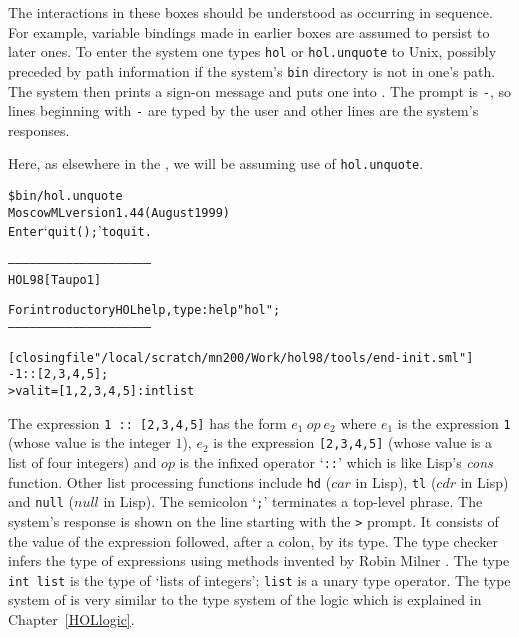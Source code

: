 The interactions in these boxes should be understood as occurring in
sequence.  For example, variable bindings made in earlier boxes are
assumed to persist to later ones.  To enter the \HOL{} system one types
{\small\verb|hol|} or {\small\verb|hol.unquote|} to Unix, possibly
  preceded by path information if the \HOL{} system's \texttt{bin}
  directory is not in one's path.  The \HOL{} system then prints a
  sign-on message and puts one into \ML.  The \ML{} prompt is
  {\small\verb|-|}, so lines beginning with {\small\verb|-|} are typed
  by the user and other lines are the system's responses.

  Here, as elsewhere in the \TUTORIAL{}, we will be assuming use of
  {\small\verb|hol.unquote|}.

\setcounter{sessioncount}{1}
\begin{session}\begin{alltt}
\$ bin/hol.unquote
Moscow ML version 1.44 (August 1999)
Enter `quit();' to quit.

-----------------------------------------------------------
           HOL98 [Taupo 1]

   For introductory HOL help, type: help "hol";
-----------------------------------------------------------

[closing file "/local/scratch/mn200/Work/hol98/tools/end-init.sml"]
- 1 :: [2,3,4,5];
> val it = [1, 2, 3, 4, 5] : int list
\end{alltt}
\end{session}

The \ML{} expression {\small\verb|1 :: [2,3,4,5]|} has the form $e_1\
op\ e_2$ where $e_1$ is the expression {\small\verb|1|} (whose value
is the integer $1$), $e_2$ is the expression {\small\verb|[2,3,4,5]|}
(whose value is a list of four integers) and $op$ is the infixed
operator `{\small\verb|::|}' which is like Lisp's {\it cons} function.
Other list processing functions include {\small\verb|hd|} ($car$ in
Lisp), {\small\verb|tl|} ($cdr$ in Lisp) and {\small\verb|null|}
($null$ in Lisp).  The semicolon `{\small\verb|;|}' terminates a
top-level phrase.  The system's response is shown on the line starting
with the {\small\verb|>|} prompt.  It consists of the value of the
expression followed, after a colon, by its type. The \ML{} type checker
infers the type of expressions using methods invented by Robin Milner
\cite{Milner-types}. The type {\small\verb|int list|} is the type of
`lists of integers'; {\small\verb|list|} is a unary type operator.
The type system of \ML{} is very similar to the type system of the
\HOL{} logic which is explained in Chapter~\ref{HOLlogic}.

